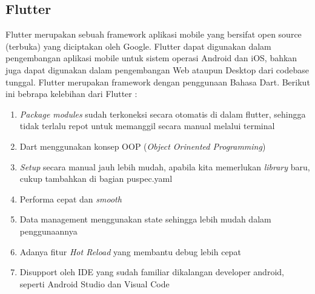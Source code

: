 \begin{flushleft}
\begin{justify}
        \subsection{Flutter}
        Flutter merupakan sebuah framework aplikasi mobile yang bersifat open source (terbuka) yang diciptakan oleh Google. Flutter dapat digunakan dalam pengembangan aplikasi mobile untuk sistem operasi Android dan iOS, bahkan juga dapat digunakan dalam pengembangan Web ataupun Desktop dari codebase tunggal. Flutter merupakan framework dengan penggunaan Bahasa Dart.
Berikut ini bebrapa kelebihan dari Flutter \cite{flutter} :
\begin{enumerate}
    \item \textit{Package modules} sudah terkoneksi secara otomatis di dalam flutter, sehingga tidak terlalu repot untuk memanggil secara manual melalui terminal
    \item Dart menggunakan konsep OOP (\textit{Object Orinented Programming})
    \item \textit{Setup} secara manual jauh lebih mudah, apabila kita memerlukan \textit{library} baru, cukup tambahkan di bagian puspec.yaml
    \item Performa cepat dan  \textit{smooth}
    \item Data management menggunakan state sehingga lebih mudah dalam penggunaannya
    \item Adanya fitur \textit{Hot Reload} yang membantu debug lebih cepat
    \item Disupport oleh IDE yang sudah familiar dikalangan developer android, seperti Android Studio dan Visual Code\\
    
\end{enumerate}



\end{justify}
\end{flushleft}
